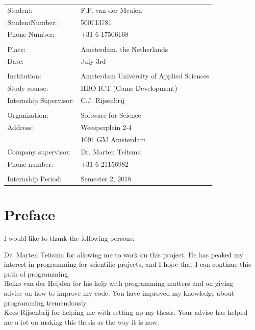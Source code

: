 \documentclass[paper=a4, fontsize=11pt,twoside]{scrartcl}	%
\begin{document}
\newpage 
\begin{longtable}{  p{8cm}  p{8cm} }
Student: & F.P. van der Meulen \\
StudentNumber: & 500713781 \\
Phone Number: & +31 6 17506168 \\
\\
Place: & Amsterdam, the Netherlands \\
Date: & July 3rd \\
\\
Institution: & Amsterdam University of Applied Sciences \\
Study course: & HBO-ICT (Game Development) \\
Internship Supervisor: & C.J. Rijsenbrij \\
\\
Organization: & Software for Science \\
Address: & Weesperplein 2-4 \\
 & 1091 GM Amsterdam \\
Company supervisor: & Dr. Marten Teitsma \\
Phone number: & +31 6 21156982\\
\\
Internship Period: & Semester 2, 2018 

\end{longtable}
\newpage



\newpage
\tableofcontents

\newpage
\section*{Preface}
I would like to thank the following persons:

Dr. Marten Teitsma for allowing me to work on this project. He has peaked my interest in programming for scientific projects, and I hope that I can continue this path of programming.\\
Heiko van der Heijden for his help with programming matters and on giving advise on how to improve my code. You have improved my knowledge about programming tremendously. \\
Kees Rijsenbrij for helping me with setting up my thesis. Your advise has helped me a lot on making this thesis as the way it is now.


\newpage
\end{document}

